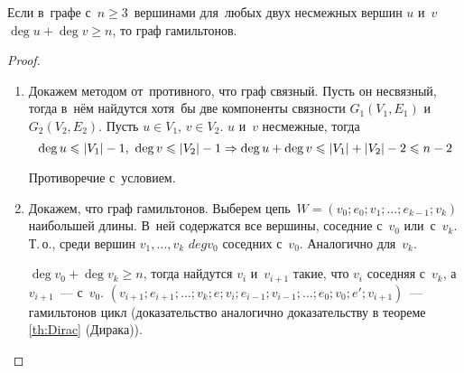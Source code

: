 \begin{theorem}[Оре]
	Если в~графе с~$n \geqslant 3$~вершинами для~любых двух несмежных вершин $u$ и~$v$ $\deg u + \deg v \geqslant n$, то граф гамильтонов.
\end{theorem}
\begin{proof}
\begin{enumerate}
	\item Докажем методом от~противного, что граф связный.
	Пусть он несвязный, тогда в~нём найдутся хотя~бы две компоненты связности $G_1(V_1, E_1)$ и~$G_2(V_2, E_2)$.
	Пусть $u \in V_1$, $v \in V_2$. $u$ и~$v$ несмежные, тогда
	\begin{equation*}
	\deg u \leqslant |V_1| - 1, \ \deg v \leqslant |V_2| - 1 \opbr\Rightarrow \deg u + \deg v \opbr\leqslant |V_1| + |V_2| - 2 \opbr\leqslant n - 2
	\end{equation*}
	
	Противоречие с~условием.
	
	\item Докажем, что граф гамильтонов.
	Выберем цепь~$W = (v_0; e_0; v_1; \ldots; e_{k-1}; v_k)$ наибольшей длины.
	В~ней содержатся все вершины, соседние с~$v_0$ или~с~$v_k$.
	Т.\,о., среди вершин $v_1, \ldots, v_k$ $deg v_0$ соседних с~$v_0$.
	Аналогично для~$v_k$.
	
	$\deg v_0 + \deg v_k \geqslant n$, тогда найдутся $v_i$ и~$v_{i+1}$ такие, что $v_i$ соседняя с~$v_k$, а $v_{i+1}$~--- с~$v_0$.\newline
	$(v_{i+1}; e_{i+1}; \ldots; v_k; e; v_i; e_{i-1}; v_{i-1}; \ldots; e_0; v_0; e'; v_{i+1})$~--- гамильтонов цикл (доказательство аналогично доказательству в теореме \ref{th:Dirac} (Дирака)).
\end{enumerate}
\end{proof}
